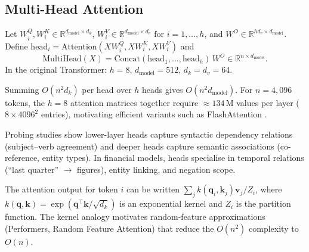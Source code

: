 \begin{deepdive}
\subsection{Multi-Head Attention}
\label{sec:transformer-mha}

\begin{definition}
\label{def:mha}
Let $W^Q_i, W^K_i \in \mathbb{R}^{d_{\mathrm{model}} \times d_k}$,
$W^V_i \in \mathbb{R}^{d_{\mathrm{model}} \times d_v}$ for $i = 1,\ldots,h$,
and $W^O \in \mathbb{R}^{h d_v \times d_{\mathrm{model}}}$.
Define $\mathrm{head}_i = \mathrm{Attention}(XW^Q_i, XW^K_i, XW^V_i)$ and
\begin{equation}
  \mathrm{MultiHead}(X)
  = \mathrm{Concat}(\mathrm{head}_1,\ldots,\mathrm{head}_h)\,W^O
  \in \mathbb{R}^{n \times d_{\mathrm{model}}}.
  \label{eq:multihead}
\end{equation}
In the original Transformer: $h = 8$, $d_{\mathrm{model}} = 512$, $d_k = d_v = 64$.
\end{definition}

Summing $O(n^2 d_k)$ per head over $h$ heads gives $O(n^2 d_{\mathrm{model}})$.
For $n = 4{,}096$ tokens, the $h = 8$ attention matrices together require
$\approx 134\,\mathrm{M}$ values per layer ($8 \times 4096^2$ entries),
motivating efficient variants such as FlashAttention
\cite{dao2022flashattention}. %

Probing studies \cite{clark2019bert} %
show lower-layer heads capture syntactic dependency relations (subject--verb
agreement) and deeper heads capture semantic associations (co-reference, entity
types). In financial models, heads specialise in temporal relations
(``last quarter'' $\to$ figures), entity linking, and negation scope.

\begin{remark}
\label{rem:kernel-trick}
The attention output for token $i$ can be written
$\sum_j k(\mathbf{q}_i,\mathbf{k}_j)\mathbf{v}_j / Z_i$,
where $k(\mathbf{q},\mathbf{k}) = \exp(\mathbf{q}^\top\mathbf{k}/\sqrt{d_k})$
is an exponential kernel and $Z_i$ is the partition function.
The kernel analogy \cite{tsai2019transformer} %
motivates random-feature approximations (Performers, Random Feature Attention) that
reduce the $O(n^2)$ complexity to $O(n)$.
\end{remark}


\end{deepdive}
